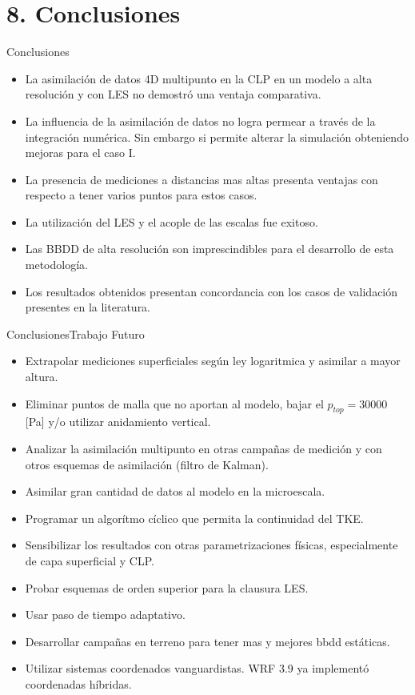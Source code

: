 \documentclass[mathserif,10pt]{beamer}
\begin{document}
\section{8. Conclusiones}
\begin{frame}{Conclusiones}
	\begin{itemize}
		\item La asimilación de datos 4D multipunto en la CLP en un modelo a alta resolución y con LES no demostró una ventaja comparativa.
		\item La influencia de la asimilación de datos no logra permear a través de la integración numérica. Sin embargo si permite alterar la simulación obteniendo mejoras para el caso I.
		\item La presencia de mediciones a distancias mas altas presenta ventajas con respecto a tener varios puntos para estos casos.
		\item La utilización del LES y el acople de las escalas fue exitoso.
		\item Las BBDD de alta resolución son imprescindibles para el desarrollo de esta metodología.
		\item Los resultados obtenidos presentan concordancia con los casos de validación presentes en la literatura.
	\end{itemize}
\end{frame}

\begin{frame}{Conclusiones}{Trabajo Futuro}
	\begin{itemize}
		\item Extrapolar mediciones superficiales según ley logaritmica y asimilar a mayor altura.
		\item Eliminar puntos de malla que no aportan al modelo, bajar el $p_{top}=30000$ [Pa] y/o utilizar anidamiento vertical.
		\item Analizar la asimilación multipunto en otras campañas de medición y con otros esquemas de asimilación (filtro de Kalman).
		\item Asimilar gran cantidad de datos al modelo en la microescala.
		\item Programar un algorítmo cíclico que permita la continuidad del TKE.
		\item Sensibilizar los resultados con otras parametrizaciones físicas, especialmente de capa superficial y CLP.
		\item Probar esquemas de orden superior para la clausura LES.
		\item Usar paso de tiempo adaptativo.
		\item Desarrollar campañas en terreno para tener mas y mejores bbdd estáticas.
		\item Utilizar sistemas coordenados vanguardistas. WRF 3.9 ya implementó coordenadas híbridas.
	\end{itemize}
\end{frame}
\end{document}
